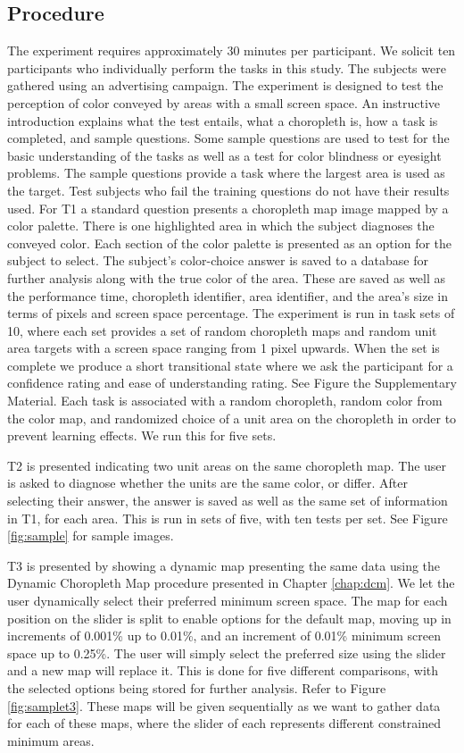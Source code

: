 \subsection{Procedure} \label{sec:process}
The experiment requires approximately 30 minutes per participant. We solicit ten participants who individually perform the tasks in this study. The subjects were gathered using an advertising campaign. The experiment is designed to test the perception of color conveyed by areas with a small screen space.  An instructive introduction explains what the test entails, what a choropleth is, how a task is completed, and sample questions. Some sample questions are used to test for the basic understanding of the tasks as well as a test for color blindness or eyesight problems. The sample questions provide a task where the largest area is used as the target. Test subjects who fail the training questions do not have their results used. For T1 a standard question presents a choropleth map image mapped by a color palette. There is one highlighted area in which the subject diagnoses the conveyed color. Each section of the color palette is presented as an option for the subject to select. The subject's color-choice answer is saved to a database for further analysis along with the true color of the area. These are saved as well as the performance time, choropleth identifier, area identifier, and the area's size in terms of pixels and screen space percentage. The experiment is run in task sets of 10, where each set provides a set of random choropleth maps and random unit area targets with a screen space ranging from 1 pixel upwards. When the set is complete we produce a short transitional state where we ask the participant for a confidence rating and ease of understanding rating. See Figure the Supplementary Material. Each task is associated with a random choropleth, random color from the color map, and randomized choice of a unit area on the choropleth in order to prevent learning effects. We run this for five sets.

T2 is presented indicating two unit areas on the same choropleth map. The user is asked to diagnose whether the units are the same color, or differ. After selecting their answer, the answer is saved as well as the same set of information in T1, for each area. This is run in sets of five, with ten tests per set. See Figure \ref{fig:sample} for sample images.

T3 is presented by showing a dynamic map presenting the same data using the Dynamic Choropleth Map procedure presented in Chapter \ref{chap:dcm}. We let the user dynamically select their preferred minimum screen space. The map for each position on the slider is split to enable options for the default map, moving up in increments of 0.001\% up to 0.01\%, and an increment of 0.01\% minimum screen space up to 0.25\%. The user will simply select the preferred size using the slider and a new map will replace it. This is done for five different comparisons, with the selected options being stored for further analysis. Refer to Figure \ref{fig:samplet3}. These maps will be given sequentially as we want to gather data for each of these maps, where the slider of each represents different constrained minimum areas.

